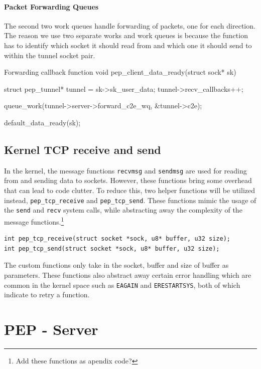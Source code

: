 \documentclass[a4paper,english, 11pt]{report}
\begin{document}
\paragraph{Packet Forwarding Queues}\label{sec:forward_queues}
The second two work queues handle forwarding of packets, one for each direction. The reason we use two separate works and work queues is because the function has to identify which socket it should read from and which one it should send to within the tunnel socket pair. \\

\begin{autonumlstlisting}[label=lst:pep_forward_callback]{Forwarding callback function}
void pep_client_data_ready(struct sock* sk)
{
	struct pep_tunnel* tunnel = sk->sk_user_data;
	tunnel->recv_callbacks++;
        
	queue_work(tunnel->server->forward_c2e_wq, &tunnel->c2e);
        
	default_data_ready(sk);
}
\end{autonumlstlisting}

\subsection{Kernel TCP receive and send}
In the kernel, the message functions \verb|recvmsg| and \verb|sendmsg| are used for reading from and sending data to sockets. However, these functions bring some overhead that can lead to code clutter. To reduce this, two helper functions will be utilized instead, \verb|pep_tcp_receive| and \verb|pep_tcp_send|. These functions mimic the usage of the \verb|send| and \verb|recv| system calls, while abstracting away the complexity of the message functions.\footnote{Add these functions as apendix code?}

\begin{verbatim}
int pep_tcp_receive(struct socket *sock, u8* buffer, u32 size);
int pep_tcp_send(struct socket *sock, u8* buffer, u32 size);
\end{verbatim}

The custom functions only take in the socket, buffer and size of buffer as parameters. These functions also abstract away certain error handling which are common in the kernel space such as \verb|EAGAIN| and \verb|ERESTARTSYS|, both of which indicate to retry a function.

\section{PEP - Server}
\end{document}
